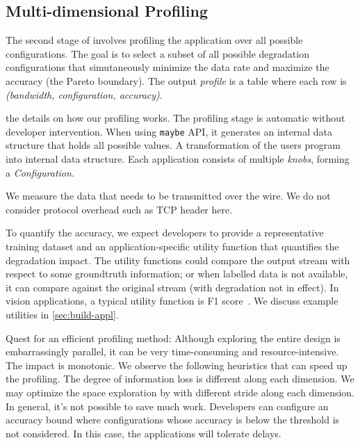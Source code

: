 \subsection{Multi-dimensional Profiling}
\label{sec:profiling}

The second stage of \sysname{} involves profiling the application over all
possible configurations. The goal is to select a subset of all possible
degradation configurations that simutaneously minimize the data rate and
maximize the accuracy (the Pareto boundary). The output \textit{profile} is a
table where each row is \textit{(bandwidth, configuration, accuracy)}.

 the details on how our profiling works. The
profiling stage is automatic without developer intervention. When using
\texttt{maybe} API, it generates an internal data structure that holds all
possible values.  A transformation of the users program into internal data
structure. Each application consists of multiple \textit{knobs}, forming a
\textit{Configuration}.

 We measure the data that needs to be transmitted over
the wire. We do not consider protocol overhead such as TCP header here.

 To quantify the accuracy, we expect developers to
provide a representative training dataset and an application-specific utility
function that quantifies the degradation impact. The utility functions could
compare the output stream with respect to some groundtruth information; or when
labelled data is not available, it can compare against the original stream (with
degradation not in effect). In vision applications, a typical utility function
is F1 score~\cite{Rijsbergen:1979:IR:539927}. We discuss example utilities in
\autoref{sec:build-appl}.

\vspace{0.5em}

Quest for an efficient profiling method: Although exploring the entire design is
embarrassingly parallel, it can be very time-consuming and
resource-intensive. The impact is monotonic. We observe the following heuristics
that can speed up the profiling. The degree of information loss is different
along each dimension. We may optimize the space exploration by with different
stride along each dimension. In general, it's not possible to save much
work.  Developers can
configure an accuracy bound where configurations whose accuracy is below the
threshold is not considered. In this case, the applications will tolerate
delays.

